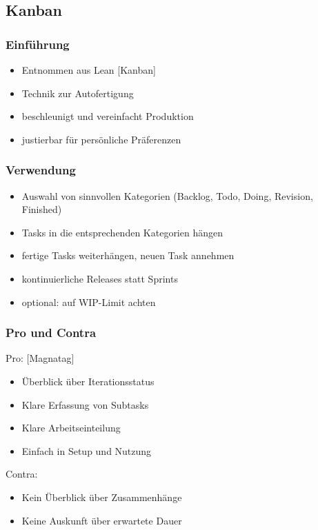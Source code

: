 \documentclass[%
	handout
]{beamer}
\newcommand{\kanban}{[Kanban]}
\newcommand{\magna}{[Magnatag]}
\begin{document}
	\subsection{Kanban}
		\begin{frame}
			\frametitle{Einführung}
			\begin{itemize}
				\item Entnommen aus Lean \kanban
				\item Technik zur Autofertigung
				\item beschleunigt und vereinfacht Produktion
				\item justierbar für persönliche Präferenzen
			\end{itemize}
		\end{frame}
		
		\begin{frame}
			\frametitle{Verwendung}
			\begin{itemize}
				\item Auswahl von sinnvollen Kategorien (Backlog, Todo, Doing, Revision, Finished)\pause
				\item Tasks in die entsprechenden Kategorien hängen\pause
				\item fertige Tasks weiterhängen, neuen Task annehmen\pause
				\item kontinuierliche Releases statt Sprints\pause
				\item optional: auf WIP-Limit achten
			\end{itemize}
		\end{frame}
		
		\begin{frame}
			\frametitle{Pro und Contra}
			\begin{minipage}[t]{.48\textwidth}
				Pro: \magna
				\begin{itemize}
					\item Überblick über Iterationsstatus
					\item Klare Erfassung von Subtasks
					\item Klare Arbeitseinteilung
					\item Einfach in Setup und Nutzung
				\end{itemize}
			\end{minipage}
			\pause
			\begin{minipage}[t]{.48\textwidth}
				Contra:
				\begin{itemize}
					\item Kein Überblick über Zusammenhänge
					\item Keine Auskunft über erwartete Dauer
				\end{itemize}
			\end{minipage}
		\end{frame}
		
\end{document}
